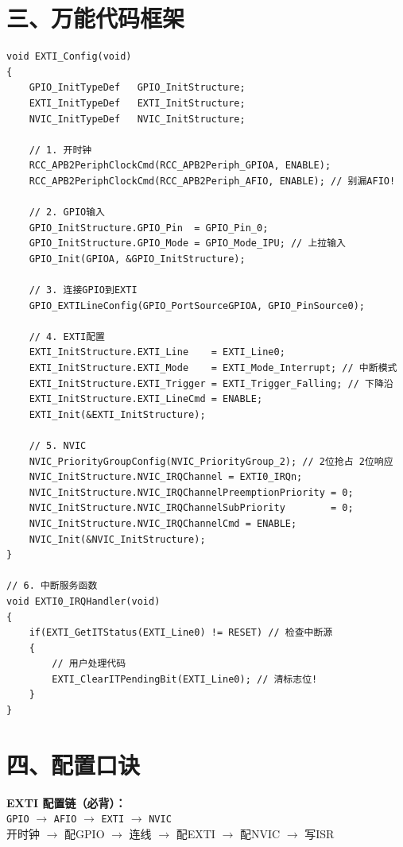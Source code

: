 \documentclass[10pt,a4paper,oneside]{ctexart}
\begin{document}
\section*{三、万能代码框架}

\begin{codebox}
\begin{lstlisting}[style=stm32, numbers=none]
void EXTI_Config(void)
{
    GPIO_InitTypeDef   GPIO_InitStructure;
    EXTI_InitTypeDef   EXTI_InitStructure;
    NVIC_InitTypeDef   NVIC_InitStructure;

    // 1. 开时钟
    RCC_APB2PeriphClockCmd(RCC_APB2Periph_GPIOA, ENABLE);
    RCC_APB2PeriphClockCmd(RCC_APB2Periph_AFIO, ENABLE); // 别漏AFIO!

    // 2. GPIO输入
    GPIO_InitStructure.GPIO_Pin  = GPIO_Pin_0;
    GPIO_InitStructure.GPIO_Mode = GPIO_Mode_IPU; // 上拉输入
    GPIO_Init(GPIOA, &GPIO_InitStructure);

    // 3. 连接GPIO到EXTI
    GPIO_EXTILineConfig(GPIO_PortSourceGPIOA, GPIO_PinSource0);

    // 4. EXTI配置
    EXTI_InitStructure.EXTI_Line    = EXTI_Line0;
    EXTI_InitStructure.EXTI_Mode    = EXTI_Mode_Interrupt; // 中断模式
    EXTI_InitStructure.EXTI_Trigger = EXTI_Trigger_Falling; // 下降沿
    EXTI_InitStructure.EXTI_LineCmd = ENABLE;
    EXTI_Init(&EXTI_InitStructure);

    // 5. NVIC
    NVIC_PriorityGroupConfig(NVIC_PriorityGroup_2); // 2位抢占 2位响应
    NVIC_InitStructure.NVIC_IRQChannel = EXTI0_IRQn;
    NVIC_InitStructure.NVIC_IRQChannelPreemptionPriority = 0;
    NVIC_InitStructure.NVIC_IRQChannelSubPriority        = 0;
    NVIC_InitStructure.NVIC_IRQChannelCmd = ENABLE;
    NVIC_Init(&NVIC_InitStructure);
}

// 6. 中断服务函数
void EXTI0_IRQHandler(void)
{
    if(EXTI_GetITStatus(EXTI_Line0) != RESET) // 检查中断源
    {
        // 用户处理代码
        EXTI_ClearITPendingBit(EXTI_Line0); // 清标志位!
    }
}
\end{lstlisting}
\end{codebox}

\section*{四、配置口诀}

\begin{tipbox}
    \textbf{EXTI 配置链（必背）：}\\[2mm]
    \texttt{GPIO} $\rightarrow$ \texttt{AFIO} $\rightarrow$ \texttt{EXTI} $\rightarrow$ \texttt{NVIC}\\[1mm]
    开时钟 $\rightarrow$ 配GPIO $\rightarrow$ 连线 $\rightarrow$ 配EXTI $\rightarrow$ 配NVIC $\rightarrow$ 写ISR
\end{tipbox}
\end{document}

